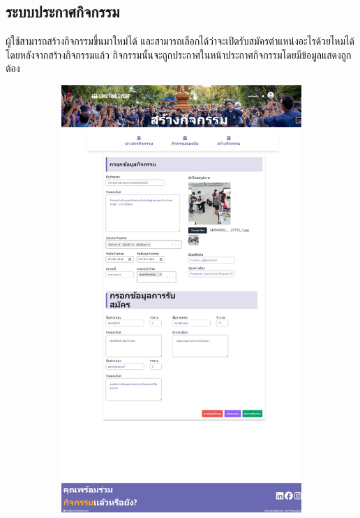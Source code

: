 \subsection{ระบบประกาศกิจกรรม}
ผู้ใช้สามารถสร้างกิจกรรมขึ้นมาใหม่ได้ และสามารถเลือกได้ว่าจะเปิดรับสมัครตำแหน่งอะไรด้วยไหมได้ โดยหลังจากสร้างกิจกรรมแล้ว กิจกรรมนั้นจะถูกประกาศในหน้าประกาศกิจกรรมโดยมีข้อมูลแสดงถูกต้อง
\begin{figure}[h]
  \centering
  \begin{subfigure}[b]{0.4\linewidth}
    \includegraphics[width=\linewidth]{image/web/create.jpeg}

\end{subfigure}
\end{figure}
